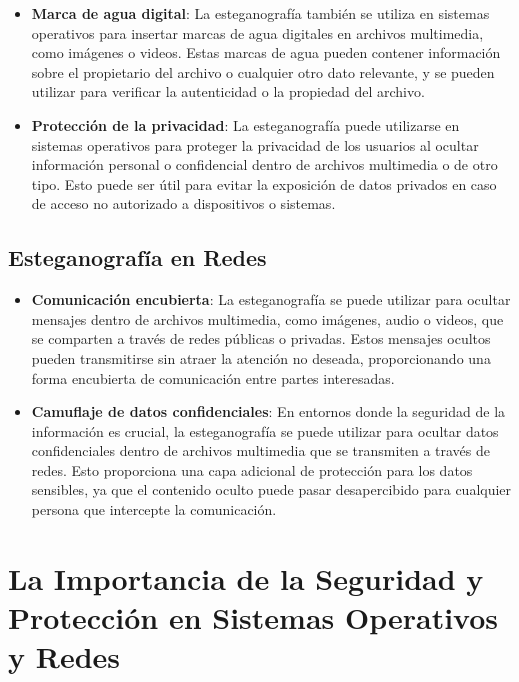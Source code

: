 \documentclass[12pt, a4paper]{article} %
\begin{document}
\begin{itemize}
	\item \textbf{Marca de agua digital}: La esteganografía también se utiliza en sistemas operativos para insertar marcas de agua digitales en archivos multimedia, como imágenes o videos. Estas marcas de agua pueden contener información sobre el propietario del archivo o cualquier otro dato relevante, y se pueden utilizar para verificar la autenticidad o la propiedad del archivo.

	\item \textbf{Protección de la privacidad}: La esteganografía puede utilizarse en sistemas operativos para proteger la privacidad de los usuarios al ocultar información personal o confidencial dentro de archivos multimedia o de otro tipo. Esto puede ser útil para evitar la exposición de datos privados en caso de acceso no autorizado a dispositivos o sistemas.
\end{itemize}

\subsection{Esteganografía en Redes}

\begin{itemize}
	\item \textbf{Comunicación encubierta}: La esteganografía se puede utilizar para ocultar mensajes dentro de archivos multimedia, como imágenes, audio o videos, que se comparten a través de redes públicas o privadas. Estos mensajes ocultos pueden transmitirse sin atraer la atención no deseada, proporcionando una forma encubierta de comunicación entre partes interesadas.

	\item \textbf{Camuflaje de datos confidenciales}: En entornos donde la seguridad de la información es crucial, la esteganografía se puede utilizar para ocultar datos confidenciales dentro de archivos multimedia que se transmiten a través de redes. Esto proporciona una capa adicional de protección para los datos sensibles, ya que el contenido oculto puede pasar desapercibido para cualquier persona que intercepte la comunicación.
\end{itemize}

\clearpage
\section{La Importancia de la Seguridad y Protección en Sistemas Operativos y Redes}
\end{document}
